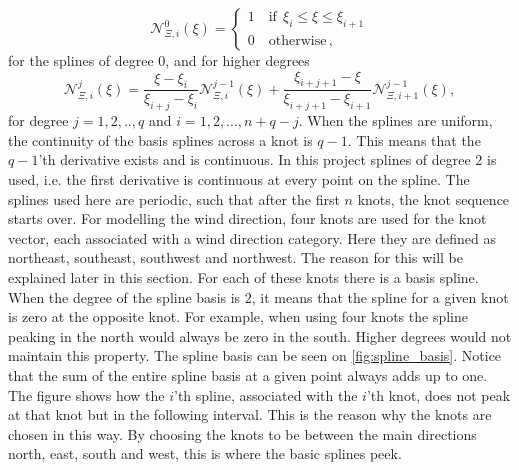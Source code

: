 \begin{equation}
    \mathcal{N}_{\Xi,i}^0 (\xi) =
    \begin{cases}
    1 \quad \text{if} \ \ \xi_i \leq \xi \leq \xi_{i+1}\\
    0 \quad \text{otherwise}\,,
    \end{cases}
\end{equation}
for the splines of degree $0$, and for higher degrees
    \begin{equation}
        \mathcal{N}_{\Xi,i}^j(\xi) = \frac{\xi-\xi_i}{\xi_{i+j}-\xi_i}\mathcal{N}_{\Xi,i}^{j-1}(\xi) + \frac{\xi_{i+j+1}-\xi}{\xi_{i+j+1}-\xi_{i+1}} \mathcal{N}_{\Xi, i + 1}^{j-1}(\xi),
    \end{equation}
for degree $j=1,2,..,q$ and $i=1,2,...,n+q-j$. When the splines are uniform, the continuity of the basis splines across a knot is $q-1$. This means that the $q-1$'th derivative exists and is continuous. In this project splines of degree $2$ is used, i.e.  the first derivative is continuous at every point on the spline. The splines used here are periodic, such that after the first $n$ knots, the knot sequence starts over. For modelling the wind direction, four knots are used for the knot vector, each associated with a wind direction category.  Here they are defined as northeast, southeast, southwest and northwest. The reason for this will be explained later in this section. For each of these knots there is a basis spline. When the degree of the spline basis is $2$, it means that the spline for a given knot is zero at the opposite knot. For example, when using four knots the spline peaking in the north would always be zero in the south. Higher degrees would not maintain this property. The spline basis can be seen on \cref{fig:spline_basis}. Notice that the sum of the entire spline basis at a given point always adds up to one. The figure shows how the $i$'th spline, associated with the $i$'th knot, does not peak at that knot but in the following interval. This is the reason why the knots are chosen in this way. By choosing the knots to be between the main directions north, east, south and west, this is where the basic splines peek.
